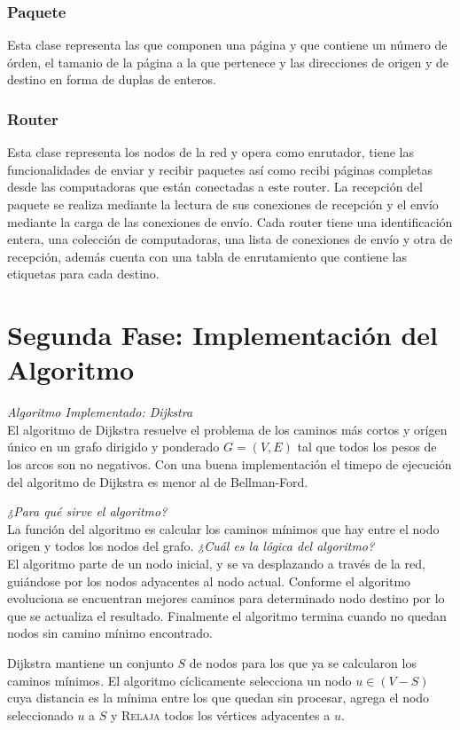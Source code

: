 \documentclass[12pt]{article} %
\begin{document}
\subsubsection{Paquete}
Esta clase representa las que componen una página y que contiene un número de órden, el tamanio de la página a la que pertenece y las direcciones de origen y de destino en forma de duplas de enteros.
\subsubsection{Router}
Esta clase representa los nodos de la red y opera como enrutador, tiene las funcionalidades de enviar y recibir paquetes así como recibi páginas completas desde las computadoras que están conectadas a este router. La recepción del paquete se realiza mediante la lectura de sus conexiones de recepción y el envío mediante la carga de las conexiones de envío. Cada router tiene una identificación entera, una colección de computadoras, una lista de conexiones de envío y otra de recepción, además cuenta con una tabla de enrutamiento que contiene las etiquetas para cada destino.

\section{Segunda Fase: Implementación del Algoritmo} %
\textit{Algoritmo Implementado: Dijkstra}\\
El algoritmo de Dijkstra resuelve el problema de los caminos más cortos y orígen único en un  grafo dirigido y ponderado $G=(V,E)$ tal que todos los pesos de los arcos son no negativos. Con una buena implementación el timepo de ejecución del algoritmo de Dijkstra es menor al de Bellman-Ford.

\textit{¿Para qué sirve el algoritmo?}\\
La función del algoritmo es calcular los caminos mínimos que hay entre el nodo origen y todos los nodos del grafo.
\textit{¿Cuál es  la lógica del algoritmo?}\\
 El algoritmo parte de un nodo inicial, y se va desplazando a través de  la red, guiándose por los nodos adyacentes al nodo actual. 
Conforme el algoritmo evoluciona se encuentran mejores caminos para determinado nodo destino por lo que se actualiza el resultado. Finalmente el algoritmo termina cuando no quedan nodos sin camino mínimo encontrado.

Dijkstra mantiene un conjunto $S$ de nodos para los que ya se calcularon los caminos mínimos. El algoritmo cíclicamente selecciona un nodo $u \in (V-S)$ cuya distancia es la mínima entre los que quedan sin procesar, agrega el nodo seleccionado $u$ a $S$ y \textsc{ Relaja} todos los vértices adyacentes a $u$.
\end{document}
